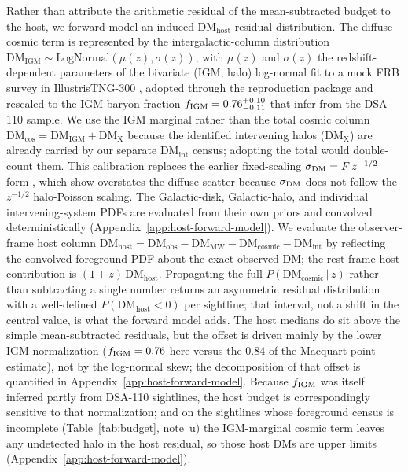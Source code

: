 Rather than attribute the arithmetic residual of the mean-subtracted budget to
the host, we forward-model an induced $\mathrm{DM_{host}}$ residual distribution. The diffuse
cosmic term is represented by the intergalactic-column distribution
$\mathrm{DM_{IGM}}\sim\mathrm{LogNormal}(\mu(z),\sigma(z))$, with $\mu(z)$ and
$\sigma(z)$ the redshift-dependent parameters of the bivariate (IGM, halo)
log-normal fit to a mock FRB survey in IllustrisTNG-300 \citep{Walker2024},
adopted through the \citet{Connor2024} reproduction package and rescaled to the
IGM baryon fraction $f_{\rm IGM}=0.76^{+0.10}_{-0.11}$ that \citet{Connor2024}
infer from the DSA-110 sample. We use the IGM marginal rather than the total
cosmic column $\mathrm{DM_{cos}}=\mathrm{DM_{IGM}}+\mathrm{DM_X}$ because the
identified intervening halos ($\mathrm{DM_X}$) are already carried by our
separate $\mathrm{DM_{int}}$ census; adopting the total would double-count them.
This calibration replaces the earlier fixed-scaling
$\sigma_{\rm DM}=F\,z^{-1/2}$ form \citep{Macquart2020, McQuinn2014, James2022},
which \citet{Connor2024} show overstates the diffuse scatter because
$\sigma_{\rm DM}$ does not follow the $z^{-1/2}$ halo-Poisson scaling. The
Galactic-disk, Galactic-halo, and individual intervening-system PDFs are
evaluated from their own priors and convolved deterministically
(Appendix~\ref{app:host-forward-model}). We evaluate the observer-frame
host column $\mathrm{DM_{host}}=\mathrm{DM_{obs}}-\mathrm{DM_{MW}}-
\mathrm{DM_{cosmic}}-\mathrm{DM_{int}}$ by reflecting the convolved foreground
PDF about the exact observed DM; the rest-frame host contribution is
$(1+z)\,\mathrm{DM_{host}}$. Propagating the full $P(\mathrm{DM_{cosmic}}\,|\,z)$
rather than subtracting a single number returns an asymmetric residual distribution with a
well-defined $P(\mathrm{DM_{host}}<0)$ per sightline; that interval, not a
shift in the central value, is what the forward model adds. The host medians
do sit above the simple mean-subtracted residuals, but the offset is driven
mainly by the lower IGM normalization ($f_{\rm IGM}=0.76$ here versus the
$0.84$ of the Macquart point estimate), not by the log-normal skew; the
decomposition of that offset is quantified in
Appendix~\ref{app:host-forward-model}. Because $f_{\rm IGM}$ was itself
inferred partly from DSA-110 sightlines, the host budget is correspondingly
sensitive to that normalization; and on the sightlines whose foreground
census is incomplete (Table~\ref{tab:budget}, note~u) the IGM-marginal cosmic
term leaves any undetected halo in the host residual, so those host DMs are
upper limits (Appendix~\ref{app:host-forward-model}).

